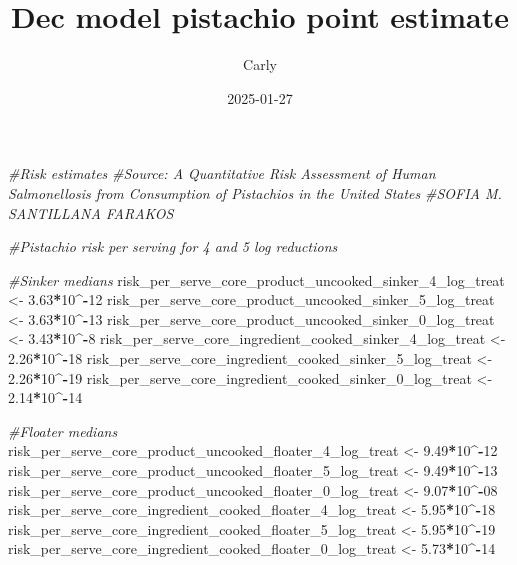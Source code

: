 \documentclass[
]{article}
\title{Dec model pistachio point estimate}
\author{Carly}
\date{2025-01-27}
\newenvironment{Shaded}{\begin{snugshade}}{\end{snugshade}}
\newcommand{\CommentTok}[1]{\textcolor[rgb]{0.56,0.35,0.01}{\textit{#1}}}
\newcommand{\DecValTok}[1]{\textcolor[rgb]{0.00,0.00,0.81}{#1}}
\newcommand{\FloatTok}[1]{\textcolor[rgb]{0.00,0.00,0.81}{#1}}
\newcommand{\NormalTok}[1]{#1}
\newcommand{\OtherTok}[1]{\textcolor[rgb]{0.56,0.35,0.01}{#1}}
\newcommand{\SpecialCharTok}[1]{\textcolor[rgb]{0.81,0.36,0.00}{\textbf{#1}}}
\begin{document}
\maketitle

\begin{Shaded}
\begin{Highlighting}[]
\CommentTok{\#Risk estimates}
\CommentTok{\#Source: A Quantitative Risk Assessment of Human Salmonellosis from Consumption of Pistachios in the United States}
\CommentTok{\#SOFIA M. SANTILLANA FARAKOS}

\CommentTok{\#Pistachio risk per serving for 4 and 5 log reductions}

\CommentTok{\#Sinker medians}
\NormalTok{risk\_per\_serve\_core\_product\_uncooked\_sinker\_4\_log\_treat }\OtherTok{\textless{}{-}} \FloatTok{3.63}\SpecialCharTok{*}\DecValTok{10}\SpecialCharTok{\^{}{-}}\DecValTok{12}
\NormalTok{risk\_per\_serve\_core\_product\_uncooked\_sinker\_5\_log\_treat }\OtherTok{\textless{}{-}} \FloatTok{3.63}\SpecialCharTok{*}\DecValTok{10}\SpecialCharTok{\^{}{-}}\DecValTok{13}
\NormalTok{risk\_per\_serve\_core\_product\_uncooked\_sinker\_0\_log\_treat }\OtherTok{\textless{}{-}} \FloatTok{3.43}\SpecialCharTok{*}\DecValTok{10}\SpecialCharTok{\^{}{-}}\DecValTok{8}
\NormalTok{risk\_per\_serve\_core\_ingredient\_cooked\_sinker\_4\_log\_treat }\OtherTok{\textless{}{-}} \FloatTok{2.26}\SpecialCharTok{*}\DecValTok{10}\SpecialCharTok{\^{}{-}}\DecValTok{18}
\NormalTok{risk\_per\_serve\_core\_ingredient\_cooked\_sinker\_5\_log\_treat }\OtherTok{\textless{}{-}} \FloatTok{2.26}\SpecialCharTok{*}\DecValTok{10}\SpecialCharTok{\^{}{-}}\DecValTok{19}
\NormalTok{risk\_per\_serve\_core\_ingredient\_cooked\_sinker\_0\_log\_treat }\OtherTok{\textless{}{-}} \FloatTok{2.14}\SpecialCharTok{*}\DecValTok{10}\SpecialCharTok{\^{}{-}}\DecValTok{14}

\CommentTok{\#Floater medians  }
\NormalTok{risk\_per\_serve\_core\_product\_uncooked\_floater\_4\_log\_treat }\OtherTok{\textless{}{-}} \FloatTok{9.49}\SpecialCharTok{*}\DecValTok{10}\SpecialCharTok{\^{}{-}}\DecValTok{12}
\NormalTok{risk\_per\_serve\_core\_product\_uncooked\_floater\_5\_log\_treat }\OtherTok{\textless{}{-}} \FloatTok{9.49}\SpecialCharTok{*}\DecValTok{10}\SpecialCharTok{\^{}{-}}\DecValTok{13}
\NormalTok{risk\_per\_serve\_core\_product\_uncooked\_floater\_0\_log\_treat }\OtherTok{\textless{}{-}} \FloatTok{9.07}\SpecialCharTok{*}\DecValTok{10}\SpecialCharTok{\^{}{-}}\DecValTok{08}
\NormalTok{risk\_per\_serve\_core\_ingredient\_cooked\_floater\_4\_log\_treat }\OtherTok{\textless{}{-}} \FloatTok{5.95}\SpecialCharTok{*}\DecValTok{10}\SpecialCharTok{\^{}{-}}\DecValTok{18}
\NormalTok{risk\_per\_serve\_core\_ingredient\_cooked\_floater\_5\_log\_treat }\OtherTok{\textless{}{-}} \FloatTok{5.95}\SpecialCharTok{*}\DecValTok{10}\SpecialCharTok{\^{}{-}}\DecValTok{19}
\NormalTok{risk\_per\_serve\_core\_ingredient\_cooked\_floater\_0\_log\_treat }\OtherTok{\textless{}{-}} \FloatTok{5.73}\SpecialCharTok{*}\DecValTok{10}\SpecialCharTok{\^{}{-}}\DecValTok{14}


\end{Highlighting}
\end{Shaded}
\end{document}
